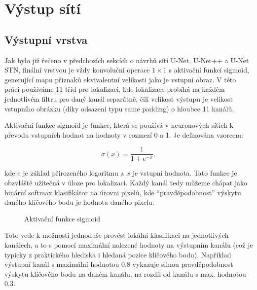 \section{Výstup sítí}
\label{sec:Chapter46}
\subsection{Výstupní vrstva}
Jak bylo již řečeno v předchozích sekcích o návrhů sítí U-Net, U-Net++ a U-Net STN, finální vrstvou je vždy konvoluční operace $1\times1$ s aktivační funkcí sigmoid, generující mapu příznaků ekvivalentní velikosti jako je vstupní obraz. V této práci používáme 11 tříd pro lokalizaci, kde lokalizace probíhá na každém jednotlivém filtru pro daný kanál separátně, čili velikost výstupu je velikost vstupního obrázku (díky odsazení typu same padding) o hloubce 11 kanálů.

Aktivační funkce sigmoid je funkce, která se používá v neuronových sítích k převodu vstupních hodnot na hodnoty v rozmezí 0 a 1. Je definována vzorcem:

\begin{equation}
\sigma(x) = \frac{1}{1+e^{-x}},
\end{equation}

kde $e$ je základ přirozeného logaritmu a $x$ je vstupní hodnota. Tato funkce je obzvláště užitečná v úloze pro lokalizaci. Každý kanál tedy můžeme chápat jako binární softmax klasifikátor na úrovni pixelů, kde \enquote{pravděpodobnost} výskytu daného klíčového bodu je hodnota daného pixelu.

\begin{figure}[H]
    \centering
    \caption[Aktivační funkce sigmoid]{Aktivační funkce sigmoid}
    \label{fig:sigmoid}
\end{figure}

Toto vede k možnosti jednoduše provést lokální klasifikaci na jednotlivých kanálech, a to s pomocí maximální nalezené hodnoty na výstupním kanálu (což je typicky z praktického hlediska i hledaná pozice klíčového bodu). Například výstupní kanál s maximální hodnotou 0.8 vykazuje silnou pravděpodobnost výskytu klíčového bodu na daném kanálu, na rozdíl od kanálu s max. hodnotou 0.3.

